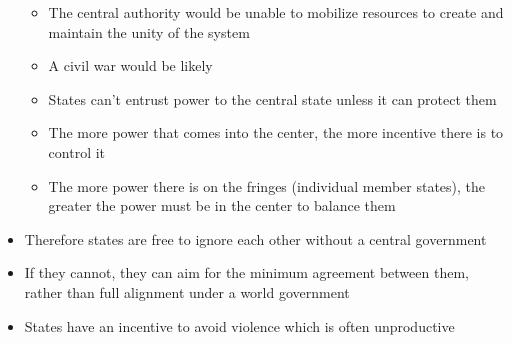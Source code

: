 \documentclass[11pt]{article}
\begin{document}
\begin{itemize}
\begin{itemize}
\item The central authority would be unable to mobilize resources to create and
maintain the unity of the system
\item A civil war would be likely
\item States can't entrust power to the central state unless it can protect them
\item The more power that comes into the center, the more incentive there is to
control it
\item The more power there is on the fringes (individual member states), the
greater the power must be in the center to balance them
\end{itemize}
\item Therefore states are free to ignore each other without a central government
\item If they cannot, they can aim for the minimum agreement between them, rather
than full alignment under a world government
\item States have an incentive to avoid violence which is often unproductive
\end{itemize}
\end{document}
